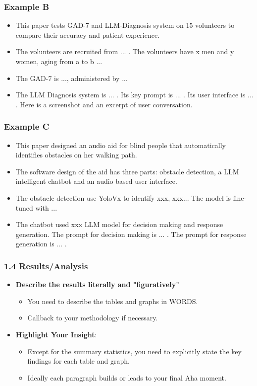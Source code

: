 \documentclass{beamer}
\begin{document}
          
      \begin{frame}
      \frametitle{Example B}
      \begin{itemize}[<+->]
          \item This paper tests GAD-7 and LLM-Diagnosis system on 15 volunteers to compare their accuracy and patient experience.
          \item The volunteers are recruited from ... . The volunteers have x men and y women, aging from a to b ...
          \item The GAD-7 is ..., administered by ... 
          \item The LLM Diagnosis system is ... . Its key prompt is ... . Its user interface is ... . Here is a screenshot and an excerpt of user conversation.
      \end{itemize}
      \end{frame}
      
      \begin{frame}
          \frametitle{Example C}
          \begin{itemize}[<+->]
              \item This paper designed an audio aid for blind people that automatically identifies obstacles on her walking path.
              \item The software design of the aid has three parts: obstacle detection, a LLM intelligent chatbot and an audio based user interface.
              \item The obstacle detection use YoloVx to identify xxx, xxx... The model is fine-tuned with ...
              \item The chatbot used xxx LLM model for decision making and response generation. The prompt for decision making is ... . The prompt for response generation is ... .
          \end{itemize}
      \end{frame} 
      
  
      
      \begin{frame}
      \frametitle{1.4 Results/Analysis}
      \begin{itemize}
          \item<1-> \textbf{Describe the results literally and "figuratively"}
          \begin{itemize}
              \item You need to describe the tables and graphs in WORDS.
              \item Callback to your methodology if necessary.
          \end{itemize}
          \item<2-> \textbf{Highlight Your Insight}:
          \begin{itemize}
              \item Except for the summary statistics, you need to explicitly state the key findings for each table and graph.
              \item Ideally each paragraph builds or leads to your final Aha moment.
          \end{itemize}
      \end{itemize}
      \end{frame}
      
\end{document}
